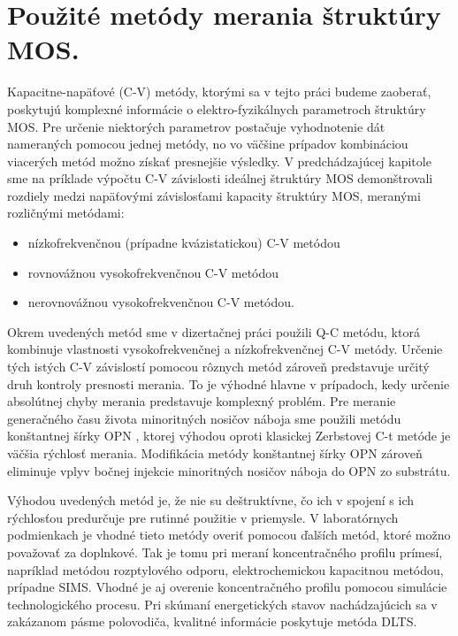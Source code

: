 
\chapter{Použité metódy merania štruktúry MOS.} %

\label{Chapter3} %



Kapacitne-napäťové (C-V) metódy, ktorými sa v tejto práci budeme
zaoberať, poskytujú komplexné informácie o elektro-fyzikálnych
parametroch štruktúry MOS.  Pre určenie niektorých parametrov
postačuje vyhodnotenie dát nameraných pomocou jednej metódy, no vo
väčšine prípadov kombináciou viacerých metód možno získať presnejšie
výsledky.  V predchádzajúcej kapitole sme na príklade výpočtu C-V
závislosti ideálnej štruktúry MOS demonštrovali rozdiely medzi
napäťovými závislosťami kapacity štruktúry MOS, meranými rozličnými
metódami:

\begin{itemize}
\item nízkofrekvenčnou (prípadne kvázistatickou) C-V metódou
\item rovnovážnou vysokofrekvenčnou C-V metódou
\item nerovnovážnou vysokofrekvenčnou C-V metódou.
\end{itemize}

Okrem uvedených metód sme v dizertačnej práci použili Q-C metódu,
ktorá kombinuje vlastnosti vysokofrekvenčnej a nízkofrekvenčnej C-V
metódy. Určenie tých istých C-V závislostí pomocou rôznych metód
zároveň predstavuje určitý druh kontroly presnosti merania.  To je
výhodné hlavne v prípadoch, kedy určenie absolútnej chyby merania
predstavuje komplexný problém. Pre meranie generačného času života
minoritných nosičov náboja sme použili metódu konštantnej šírky OPN
\cite{3.1}, ktorej výhodou oproti klasickej Zerbstovej C-t metóde
\cite{3.2} je väčšia rýchlosť merania. Modifikácia metódy konštantnej
šírky OPN \cite{3.3} zároveň eliminuje vplyv bočnej injekcie
minoritných nosičov náboja do OPN zo substrátu.

Výhodou uvedených metód je, že nie su deštruktívne, čo ich v spojení s
ich rýchlosťou predurčuje pre rutinné použitie v priemysle.  V
laboratórnych podmienkach je vhodné tieto metódy overiť pomocou
ďalších metód, ktoré možno považovať za doplnkové. Tak je tomu pri
meraní koncentračného profilu prímesí, napríklad metódou rozptylového
odporu, elektrochemickou kapacitnou metódou, prípadne SIMS. Vhodné je
aj overenie koncentračného profilu pomocou simulácie technologického
procesu. Pri skúmaní energetických stavov nachádzajúcich sa v
zakázanom pásme polovodiča, kvalitné informácie poskytuje metóda DLTS.

